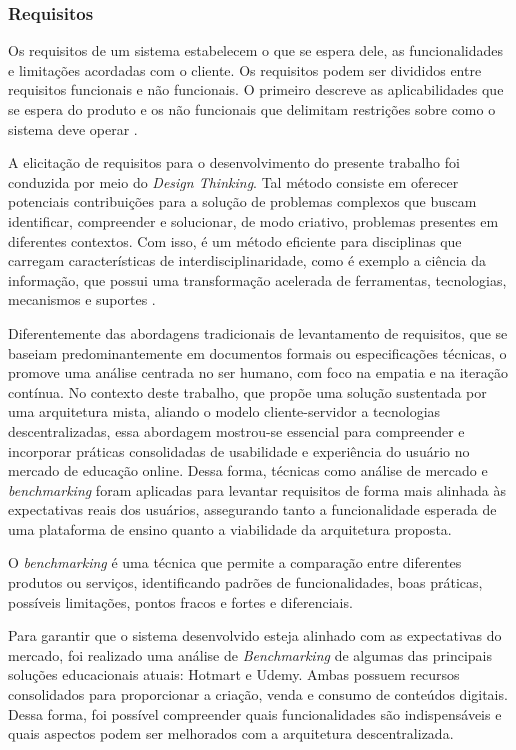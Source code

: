         \subsubsection{Requisitos}
        Os requisitos de um sistema estabelecem o que se espera dele, as funcionalidades e limitações acordadas com o cliente. Os requisitos podem ser divididos entre requisitos funcionais e não funcionais. O primeiro descreve as aplicabilidades que se espera do produto e os não funcionais que delimitam restrições sobre como o sistema deve operar \cite{sommerville2011}.

        A elicitação de requisitos para o desenvolvimento do presente trabalho foi conduzida por meio do \textit{Design Thinking}. Tal método consiste em oferecer potenciais contribuições para a solução de problemas complexos que buscam identificar, compreender e solucionar, de modo criativo, problemas presentes em diferentes contextos. Com isso, é um método eficiente para disciplinas que carregam características de interdisciplinaridade, como é exemplo a ciência da informação, que possui uma transformação acelerada de ferramentas, tecnologias, mecanismos e suportes \cite{apocalypse2022}.

        Diferentemente das abordagens tradicionais de levantamento de requisitos, que se baseiam predominantemente em documentos formais ou especificações técnicas, o  promove uma análise centrada no ser humano, com foco na empatia e na iteração contínua. No contexto deste trabalho, que propõe uma solução sustentada por uma arquitetura mista, aliando o modelo cliente-servidor a tecnologias descentralizadas, essa abordagem mostrou-se essencial para compreender e incorporar práticas consolidadas de usabilidade e experiência do usuário no mercado de educação online. Dessa forma, técnicas como análise de mercado e \textit{benchmarking} foram aplicadas para levantar requisitos de forma mais alinhada às expectativas reais dos usuários, assegurando tanto a funcionalidade esperada de uma plataforma de ensino quanto a viabilidade da arquitetura proposta.

        O \textit{benchmarking} é uma técnica que permite a comparação entre diferentes produtos ou serviços, identificando padrões de funcionalidades, boas práticas, possíveis limitações, pontos fracos e fortes e diferenciais.

        Para garantir que o sistema desenvolvido esteja alinhado com as expectativas do mercado, foi realizado uma análise de \textit{Benchmarking} de algumas das principais soluções educacionais atuais: Hotmart e Udemy. Ambas possuem recursos consolidados para proporcionar a criação, venda e consumo de conteúdos digitais. Dessa forma, foi possível compreender quais funcionalidades são indispensáveis e quais aspectos podem ser melhorados com a arquitetura descentralizada.

